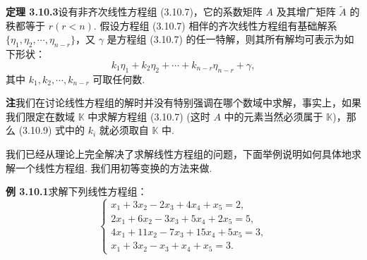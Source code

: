 \documentclass[UTF8,12pt,a4paper,fontset=fandol]{ctexart}
\begin{document}
\noindent\textbf{定理 3.10.3}\quad 设有非齐次线性方程组 (3.10.7)，它的系数矩阵 $A$ 及其增广矩阵 $\widetilde{A}$ 的秩都等于 $r(r<n)$. 假设方程组 (3.10.7) 相伴的齐次线性方程组有基础解系 $\{\eta_1,\eta_2,\cdots,\eta_{n-r}\}$，又 $\gamma$ 是方程组 (3.10.7) 的任一特解，则其所有解均可表示为如下形状：
\begin{equation}
k_1\eta_1+k_2\eta_2+\cdots+k_{n-r}\eta_{n-r}+\gamma,
\tag{3.10.9}
\end{equation}
其中 $k_1,k_2,\cdots,k_{n-r}$ 可取任何数.

\noindent\textbf{注}\quad 我们在讨论线性方程组的解时并没有特别强调在哪个数域中求解，事实上，如果我们限定在数域 $\mathbb{K}$ 中求解方程组 (3.10.7) (这时 $A$ 中的元素当然必须属于 $\mathbb{K}$)，那么 (3.10.9) 式中的 $k_i$ 就必须取自 $\mathbb{K}$ 中.

我们已经从理论上完全解决了求解线性方程组的问题，下面举例说明如何具体地求解一个线性方程组. 我们用初等变换的方法来做.

\noindent\textbf{例 3.10.1}\quad 求解下列线性方程组：
\[
\left\{\begin{array}{r}
x_1+3x_2-2x_3+4x_4+x_5=2,\\
2x_1+6x_2-3x_3+5x_4+2x_5=5,\\
4x_1+11x_2-7x_3+15x_4+5x_5=3,\\
x_1+3x_2-x_3+x_4+x_5=3.
\end{array}\right.
\]
\end{document}
